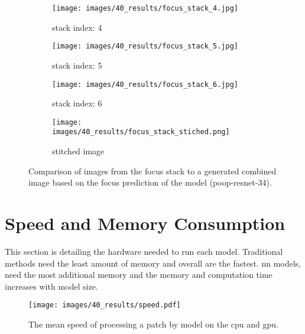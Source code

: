 \begin{figure}
    \centering
    \begin{subfigure}[b]{\textwidth}
        \centering
        \caption{stack index: 4}
        \texttt{[image: images/40\_results/focus\_stack\_4.jpg]}
        \label{fig:Results:Stack:SideBySide:Index0}
    \end{subfigure}
    \begin{subfigure}[b]{\textwidth}
        \centering
        \caption{stack index: 5}
        \texttt{[image: images/40\_results/focus\_stack\_5.jpg]}
        \label{fig:Results:Stack:SideBySide:Index1}
    \end{subfigure}
    \begin{subfigure}[b]{\textwidth}
        \centering
        \caption{stack index: 6}
        \texttt{[image: images/40\_results/focus\_stack\_6.jpg]}
        \label{fig:Results:Stack:SideBySide:Index2}
    \end{subfigure}
    \begin{subfigure}[b]{\textwidth}
        \centering
        \caption{stitched image}
        \texttt{[image: images/40\_results/focus\_stack\_stiched.png]}
        \label{fig:Results:Stack:SideBySide:Stiched}
    \end{subfigure}
    \caption{Comparison of images from the focus stack to a generated combined image based on the focus prediction of the model (\acs{poop}-\acs{resnet}-34).}
    \label{fig:Results:Stack:SideBySide}
\end{figure}

\section{Speed and Memory Consumption}
\label{sec:Results:Computation}

This section is detailing the hardware needed to run each model. Traditional methods need the least amount of memory and overall are the fastest. \Acl{nn} models, need the most additional memory and the memory and computation time increases with model size. 


\begin{figure}
    \centering
    \texttt{[image: images/40\_results/speed.pdf]}
    \caption{The mean speed of processing a patch by model on the \ac{cpu} and \ac{gpu}.}
    \label{fig:Results:Computation:Speed}
\end{figure}

